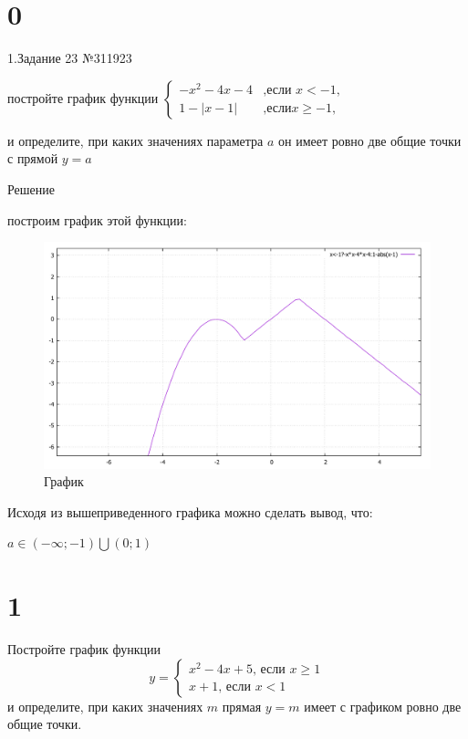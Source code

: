 \documentclass{article}
\begin{document}
\section{0}
	1.Задание 23 №311923
\par
\par
постройте график функции
 $
\begin{cases}
-x^2-4x-4&\text{,если $x<-1$,}\\
1-|x-1| &\text{,если$x\geqslant-1$,}
\end{cases}
$
\par
и определите, при каких значениях параметра {$a$} он имеет ровно две общие точки с прямой {$y=a$}
\par
Решение
\par
построим график этой функции:
\par
\begin{figure}[h]
	\includegraphics[scale=0.5]{superplot.pdf}
	\caption{График}
	\label{fig:image}
\end{figure}
\par
Исходя из вышеприведенного графика можно сделать вывод, что: 
\par
{$a\in(-\infty;-1)\bigcup(0;1) $}






\section{1}
Постройте график функции
\begin{equation*}
y = 
 \begin{cases}
   x^2-4x+5 \text{, если } x \geq 1 \\
   x+1 \text{, если } x<1
 \end{cases}
\end{equation*}
и определите, при каких значениях $m$ прямая $y = m$ имеет с графиком ровно две общие точки.
\end{document}
